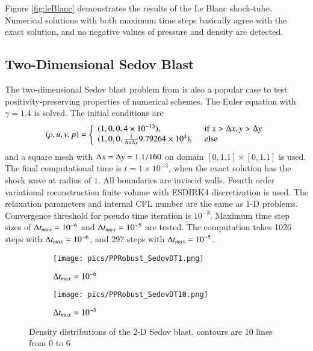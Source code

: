 \documentclass[preprint,12pt]{elsarticle}
\begin{document}
Figure \ref{fig:leBlanc} demonstrates 
the results of the Le Blanc shock-tube.
Numerical solutions with both maximum time steps 
basically agree with the exact solution, 
and no negative values of pressure and density are detected. 


\subsection{Two-Dimensional Sedov Blast}

The two-dimensional Sedov blast problem from \cite{zhang2010positivity}
is also a popular
case to test positivity-preserving properties of 
numerical schemes. 
The Euler equation with $\gamma = 1.4$ is solved.
The initial conditions 
are 
\begin{equation}
    (\rho,u,v,p) = \left\{
        \begin{array}{ll}
            (1,0,0,4\times 10 ^{-13}),\ \ & \text{if } x > \mathrm\Delta x, y > \mathrm\Delta y \\
            (1,0,0,\frac{1}{\mathrm\Delta x\mathrm\Delta y}9.79264\times10^{4}),\ \ & \text{else}\\
        \end{array}
    \right.
\end{equation}
and a square mesh with $\mathrm\Delta x = \mathrm\Delta y = 1.1/160$ on domain $[0,1.1]\times[0,1.1]$
is used. The final computational time is $t = 1\times10^{-3}$,
when the exact solution has the shock wave at radius of $1$. 
All boundaries are inviscid walls.
Fourth order variational reconstruction finite volume with ESDIRK4
 discretization is used. 
The relaxation parameters and internal CFL number are the same as 1-D problems.
Convergence threshold for pseudo time iteration is $10^{-3}$. 
Maximum time step sizes of $\mathrm\Delta t_{max}=10^{-6}$ and $\mathrm\Delta t_{max}=10^{-5}$
are tested. 
The computation takes 1026 steps with $\mathrm\Delta t_{max}=10^{-6}$, 
and 297 steps with $\mathrm\Delta t_{max}=10^{-5}$.


\begin{figure}[htbp]
    \centering
    \begin{subfigure}{0.5\textwidth}
        \texttt{[image: pics/PPRobust\_SedovDT1.png]}
        \caption[]{$\mathrm\Delta t_{max}=10^{-6}$}
    \end{subfigure}\hfill
    \begin{subfigure}{0.5\textwidth}
        \texttt{[image: pics/PPRobust\_SedovDT10.png]}
        \caption[]{$\mathrm\Delta t_{max}=10^{-5}$}
    \end{subfigure}
    \caption{Density distributions of the 2-D Sedov blast, contours are 10 lines from 0 to 6}
    \label{fig:sedov}
\end{figure}
\end{document}
